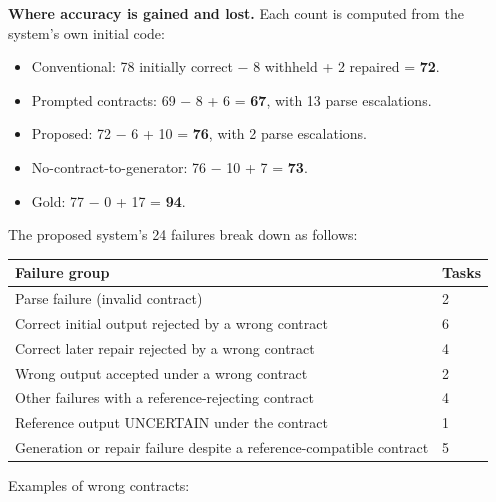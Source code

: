 \documentclass[11pt]{article}
\providecommand{\tightlist}{\setlength{\itemsep}{0pt}\setlength{\parskip}{0pt}}
\begin{document}
\textbf{Where accuracy is gained and lost.} Each count is computed from
the system's own initial code:

\begin{itemize}
\tightlist
\item
  Conventional: 78 initially correct − 8 withheld + 2 repaired =
  \textbf{72}.
\item
  Prompted contracts: 69 − 8 + 6 = \textbf{67}, with 13 parse
  escalations.
\item
  Proposed: 72 − 6 + 10 = \textbf{76}, with 2 parse escalations.
\item
  No-contract-to-generator: 76 − 10 + 7 = \textbf{73}.
\item
  Gold: 77 − 0 + 17 = \textbf{94}.
\end{itemize}

The proposed system's 24 failures break down as follows:

\vspace{4pt}\begin{center}
\footnotesize\setlength{\tabcolsep}{3pt}\renewcommand{\arraystretch}{1.1}
\begin{tabularx}{\columnwidth}{>{\raggedright\arraybackslash}Xl}
\toprule
\textbf{Failure group} & \textbf{Tasks} \\
\midrule
Parse failure (invalid contract) & 2 \\
Correct initial output rejected by a wrong contract & 6 \\
Correct later repair rejected by a wrong contract & 4 \\
Wrong output accepted under a wrong contract & 2 \\
Other failures with a reference-rejecting contract & 4 \\
Reference output UNCERTAIN under the contract & 1 \\
Generation or repair failure despite a reference-compatible contract & 5 \\
\bottomrule
\end{tabularx}
\end{center}\vspace{2pt}

Examples of wrong contracts:
\end{document}
